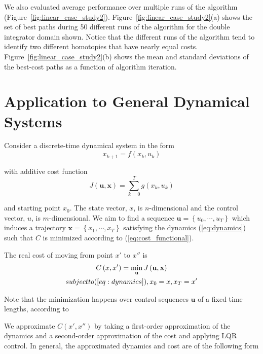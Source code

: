 \documentclass[letterpaper, 10pt, english, conference]{IEEEtran}
\begin{document}
We also evaluated average performance over multiple runs of the
algorithm
(Figure~\ref{fig:linear_case_study2}). Figure~\ref{fig:linear_case_study2}(a)
shows the set of best paths during 50 different runs of the algorithm
for the double integrator domain shown. Notice that the different runs
of the algorithm tend to identify two different homotopies that have
nearly equal costs. Figure~\ref{fig:linear_case_study2}(b) shows the
mean and standard deviations of the best-cost paths as a function of
algorithm iteration.



\section{Application to General Dynamical Systems}

Consider a discrete-time dynamical system in the form
\begin{equation}
x_{k+1}=f\left(x_{k},u_{k}\right)\label{eq:dynamics}
\end{equation}


with additive cost function
\begin{equation}
J\left(\mathbf{u},\mathbf{x}\right)=\sum_{k=0}^{T}g\left(x_{k},u_{k}\right)\label{eq:cost_functional}
\end{equation}


and starting point $x_{0}$. The state vector, $x$, is $n$-dimensional
and the control vector, $u$, is $m$-dimensional. We aim to find
a sequence $ $$\mathbf{u}=\left\{ u_{0},\cdots,u_{T}\right\} $ which
induces a trajectory $\mathbf{x}=\left\{ x_{1},\cdots,x_{T}\right\} $
satisfying the dynamics (\ref{eq:dynamics}) such that $ $$C$ is
minimized according to (\ref{eq:cost_functional}).

The real cost of moving from point $x'$ to $x''$ is
\begin{multline*}
C\left(x,x'\right)=\min_{\mathbf{u}}J\left(\mathbf{u},\mathbf{x}\right)\\
\mbox{subject to (\ensuremath{\ref{eq:dynamics}}), \ensuremath{x_{0}=x}, \ensuremath{x_{T}=x'}}
\end{multline*}


Note that the minimization happens over control sequences $\mathbf{u}$
of a fixed time lengths, according to

We approximate $C\left(x',x''\right)$ by taking a first-order approximation
of the dynamics and a second-order approximation of the cost and applying
LQR control. In general, the approximated dynamics and cost are of
the following form
\end{document}
